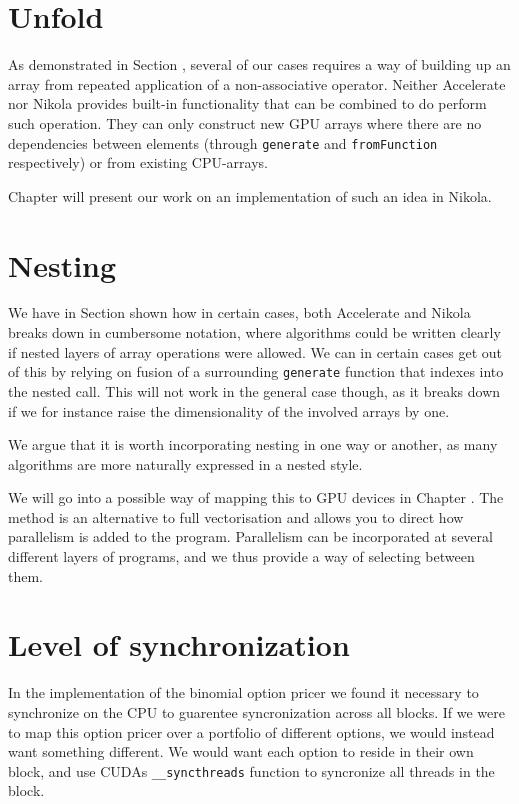 \section{Unfold}
As demonstrated in Section , several of our cases requires a
way of building up an array from repeated application of a
non-associative operator. Neither Accelerate nor Nikola provides
built-in functionality that can be combined to do perform such
operation. They can only construct new GPU arrays where there are no
dependencies between elements (through \texttt{generate} and
\texttt{fromFunction} respectively) or from existing CPU-arrays.

Chapter  will present our work on an implementation of such
an idea in Nikola.

\section{Nesting}
We have in Section  shown how in certain cases, both
Accelerate and Nikola breaks down in cumbersome notation, where
algorithms could be written clearly if nested layers of array
operations were allowed. We can in certain cases get out of this by
relying on fusion of a surrounding \texttt{generate} function that
indexes into the nested call. This will not work in the general case
though, as it breaks down if we for instance raise the dimensionality
of the involved arrays by one.

We argue that it is worth incorporating nesting in one way or another,
as many algorithms are more naturally expressed in a nested style.

We will go into a possible way of mapping this to GPU devices in
Chapter . The method is an alternative to full vectorisation
and allows you to direct how parallelism is added to the
program. Parallelism can be incorporated at several different layers
of programs, and we thus provide a way of selecting between them.

\section{Level of synchronization}
In the implementation of the binomial option pricer we found it
necessary to synchronize on the CPU to guarentee syncronization across
all blocks. If we were to map this option pricer over a portfolio of
different options, we would instead want something different. We would
want each option to reside in their own block, and use CUDAs
\texttt{\_\_syncthreads} function to syncronize all threads in the
block.

